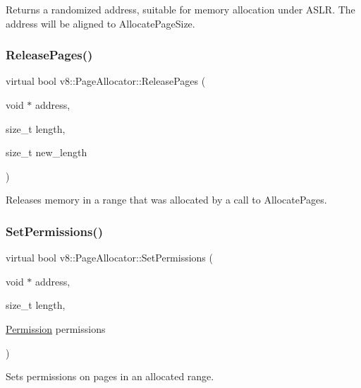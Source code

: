 Returns a randomized address, suitable for memory allocation under A\+S\+LR. The address will be aligned to Allocate\+Page\+Size. \mbox{\label{classv8_1_1PageAllocator_a6eb6bd93c8880dd022a61a13c65f66c0}} 
\subsubsection{\texorpdfstring{Release\+Pages()}{ReleasePages()}}
{\footnotesize\ttfamily virtual bool v8\+::\+Page\+Allocator\+::\+Release\+Pages (\begin{DoxyParamCaption}\item[{void $\ast$}]{address,  }\item[{size\+\_\+t}]{length,  }\item[{size\+\_\+t}]{new\+\_\+length }\end{DoxyParamCaption})\hspace{0.3cm}{\ttfamily [pure virtual]}}

Releases memory in a range that was allocated by a call to Allocate\+Pages. \mbox{\label{classv8_1_1PageAllocator_aa3817d5bfaba9ec280a6cfb60e6adda0}} 
\subsubsection{\texorpdfstring{Set\+Permissions()}{SetPermissions()}}
{\footnotesize\ttfamily virtual bool v8\+::\+Page\+Allocator\+::\+Set\+Permissions (\begin{DoxyParamCaption}\item[{void $\ast$}]{address,  }\item[{size\+\_\+t}]{length,  }\item[{\mbox{\hyperlink{classv8_1_1PageAllocator_a88f74b164fe97e053259f67a95758415}{Permission}}}]{permissions }\end{DoxyParamCaption})\hspace{0.3cm}{\ttfamily [pure virtual]}}

Sets permissions on pages in an allocated range. \mbox{\label{classv8_1_1PageAllocator_a9481a73527915fd200f6e1e9ed4b3eba}} 
